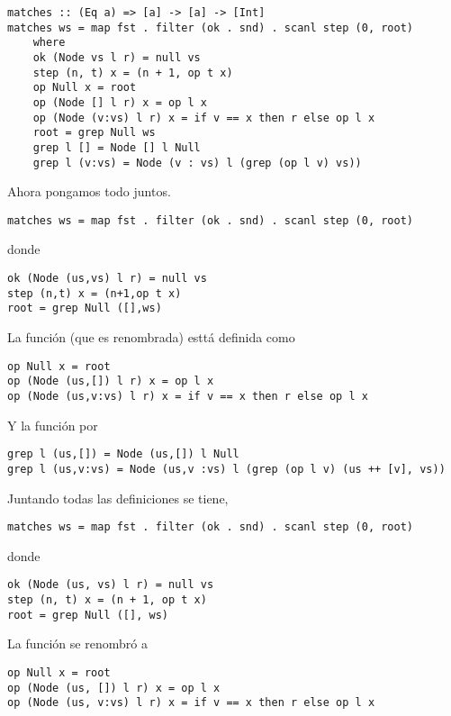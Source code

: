 \begin{verbatim}
matches :: (Eq a) => [a] -> [a] -> [Int]
matches ws = map fst . filter (ok . snd) . scanl step (0, root)
    where
    ok (Node vs l r) = null vs
    step (n, t) x = (n + 1, op t x)
    op Null x = root
    op (Node [] l r) x = op l x
    op (Node (v:vs) l r) x = if v == x then r else op l x
    root = grep Null ws
    grep l [] = Node [] l Null
    grep l (v:vs) = Node (v : vs) l (grep (op l v) vs))
\end{verbatim}

Ahora pongamos todo juntos.
\begin{verbatim}
matches ws = map fst . filter (ok . snd) . scanl step (0, root)
\end{verbatim}

donde

\begin{verbatim}
ok (Node (us,vs) l r) = null vs
step (n,t) x = (n+1,op t x)
root = grep Null ([],ws)
\end{verbatim}

La función  (que es  renombrada) esttá definida como
\begin{verbatim}
op Null x = root
op (Node (us,[]) l r) x = op l x
op (Node (us,v:vs) l r) x = if v == x then r else op l x
\end{verbatim}

Y la función  por
\begin{verbatim}
grep l (us,[]) = Node (us,[]) l Null
grep l (us,v:vs) = Node (us,v :vs) l (grep (op l v) (us ++ [v], vs))
\end{verbatim}

Juntando todas las definiciones se tiene,

\begin{verbatim}
matches ws = map fst . filter (ok . snd) . scanl step (0, root)
\end{verbatim}

donde
\begin{verbatim}
ok (Node (us, vs) l r) = null vs
step (n, t) x = (n + 1, op t x)
root = grep Null ([], ws)
\end{verbatim}

La función  se renombró a 
\begin{verbatim}
op Null x = root
op (Node (us, []) l r) x = op l x
op (Node (us, v:vs) l r) x = if v == x then r else op l x
\end{verbatim}

